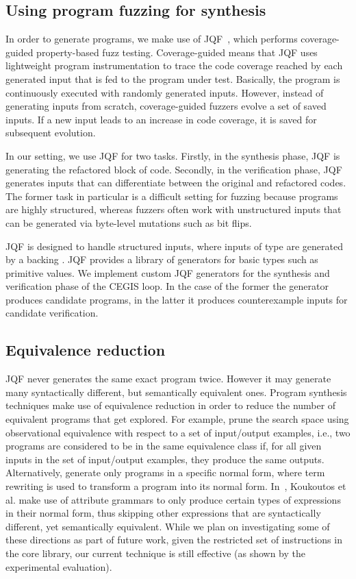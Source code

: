 \documentclass[sigconf,review,anonymous]{acmart}
\begin{document}
\subsection{Using program fuzzing for synthesis} \label{sec:fuzzing}

In order to generate programs, we make use of JQF~\cite{DBLP:conf/issta/PadhyeLS19}, which performs 
coverage-guided property-based fuzz testing.
Coverage-guided means that JQF uses lightweight program
instrumentation to trace the code coverage reached by each generated
input that is fed to the program under test.  Basically, the program
is continuously executed with randomly generated inputs. However,
instead of generating inputs from scratch, coverage-guided fuzzers
evolve a set of saved inputs. If a new input leads to an increase
in code coverage, it is saved for subsequent evolution.

In our setting, we use JQF for two tasks. Firstly, in the synthesis phase, 
JQF is generating the refactored block of code.
Secondly, in the verification phase, JQF generates
inputs that can differentiate between the original and refactored codes.
The former task in particular is a difficult setting for fuzzing because programs are
highly structured, whereas fuzzers often work with unstructured inputs
that can be generated via byte-level mutations such as bit flips.

JQF is designed to handle structured inputs, where inputs of type 
are generated by a backing . JQF provides a library of
generators for basic types such as primitive values. We implement custom
JQF generators for the synthesis and verification phase of the CEGIS loop. In
the case of the former the generator produces candidate programs, in the latter
it produces counterexample inputs %
for candidate verification.

\subsection{Equivalence reduction}
JQF never generates the same exact program twice. However it may generate many
syntactically different, but semantically equivalent ones.
Program synthesis techniques make use of equivalence reduction in order to
reduce the number of equivalent programs that get explored.
For example, \citet{DBLP:conf/cav/AlbarghouthiGK13} 
prune the search space using observational equivalence with respect to a set of input/output examples, i.e., two programs are considered to be in the same equivalence class if, for all given inputs in the set of input/output examples, they produce the same outputs. Alternatively, \citet{DBLP:conf/vmcai/SmithA19} generate only programs in a specific normal form, where term rewriting is used to transform a program into its normal form. In~\cite{DBLP:journals/corr/KoukoutosKK16}, Koukoutos et al. make use of attribute grammars to only produce certain types of expressions in their normal form, thus skipping other expressions
that are syntactically different, yet semantically equivalent.
While we plan on investigating some of these directions as part of future work,
given the restricted set of instructions in the core library,
our current technique is still effective (as shown by the experimental evaluation).
\end{document}
